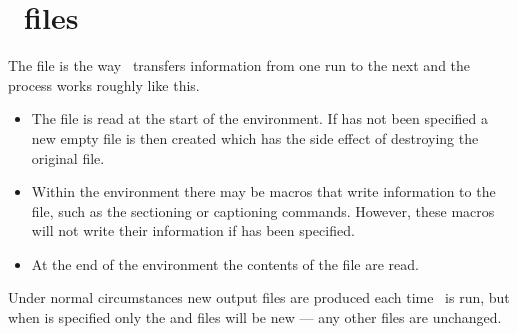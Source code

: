 
\section{\ltx\ files} \label{sec:latexfiles}

    The  file is the way \ltx\ transfers information from one
run to the next and the process works roughly like this.
\begin{itemize}
\item The  file is read at the start of the 
      environment. If \cmd{\nofiles} has not been specified a 
      new empty  file is then created which has the side
      effect of destroying the original  file.
\item Within the  environment there may be macros that write
      information to the  file, such as the sectioning or
      captioning commands. However, these macros will not write their
      information if \cmd{\nofiles} has been specified.
\item At the end of the  environment the contents
      of the  file are read.
\end{itemize}
Under normal circumstances new output files are produced each time \ltx\
is run, but when \cmd{\nofiles} is specified only the  and
\pixfile{log} files will be new --- any other files are unchanged.

